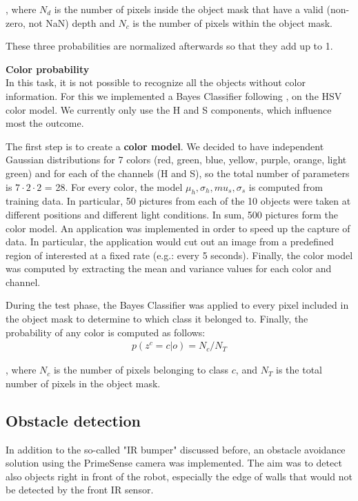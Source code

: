 , where $N_d$ is the number of pixels inside the object mask that have a valid (non-zero, not NaN) depth and $N_c$ is the number of pixels within the object mask. 

These three probabilities are normalized afterwards so that they add up to 1.

\textbf{Color probability}\\
In this task, it is not possible to recognize all the objects without color information. For this we implemented a Bayes Classifier following \cite{Bayes}, on the HSV color model. We currently only use the H and S components, which influence most the outcome. 

The first step is to create a \textbf{color model}. We decided to have independent Gaussian distributions for 7 colors (red, green, blue, yellow, purple, orange, light green) and for each of the channels (H and S), so the total number of parameters is $7 \cdot 2 \cdot 2$ = 28. For every color, the model ${\mu_h, \sigma_h, mu_s, \sigma_s}$ is computed from training data. In particular, 50 pictures from each of the 10 objects were taken at different positions and different light conditions. In sum, 500 pictures form the color model. An application was implemented in order to speed up the capture of data. In particular, the application would cut out an image from a predefined region of interested at a fixed rate (e.g.: every 5 seconds). Finally, the color model was computed by extracting the mean and variance values for each color and channel.

During the test phase, the Bayes Classifier was applied to every pixel included in the object mask to determine to which class it belonged to. Finally, the probability of any color is computed as follows:
\begin{align}
p(z^c = c | o ) = N_c / N_T
\end{align}

, where $N_c$ is the number of pixels belonging to class $c$, and $N_T$ is the total number of pixels in the object mask. 

\subsection{Obstacle detection}

In addition to the so-called "IR bumper" discussed before, an obstacle avoidance solution using the PrimeSense camera was implemented. The aim was to detect also objects right in front of the robot, especially the edge of walls that would not be detected by the front IR sensor.


